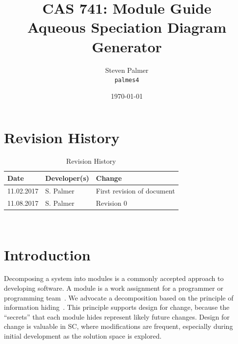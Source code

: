 \documentclass[12pt, titlepage]{article}
\begin{document}

\title{CAS 741: Module Guide\\[10pt]\Large Aqueous Speciation Diagram Generator}
\author{Steven Palmer\\\texttt{palmes4}}
\date{\today}
	
\maketitle


\setcounter{secnumdepth}{0}

\section{Revision History}

\begin{table}[hp]
\caption{Revision History} \label{TblRevisionHistory}
\begin{tabularx}{\textwidth}{llX}
\toprule
\textbf{Date} & \textbf{Developer(s)} & \textbf{Change}\\
\midrule
11.02.2017 & S. Palmer & First revision of document\\
11.08.2017 & S. Palmer & Revision 0\\
\bottomrule
\end{tabularx}
\end{table}

~\newpage

\tableofcontents

\listoftables

\listoffigures

\newpage


\setcounter{secnumdepth}{3}

\section{Introduction}

Decomposing a system into modules is a commonly accepted approach to developing
software.  A module is a work assignment for a programmer or programming
team~\citep{ParnasEtAl1984}.  We advocate a decomposition
based on the principle of information hiding~\citep{Parnas1972a}.  This
principle supports design for change, because the ``secrets'' that each module
hides represent likely future changes.  Design for change is valuable in SC,
where modifications are frequent, especially during initial development as the
solution space is explored.  
\end{document}
